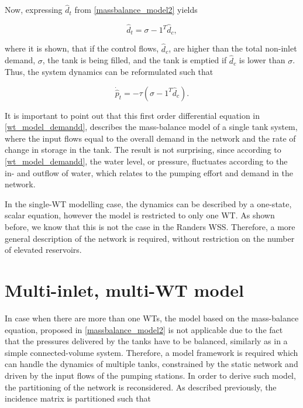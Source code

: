 Now, expressing $\hat{d}_t $ from \eqref{massbalance_model2} yields

\begin{equation}
\label{massbalance_model2_1}
\hat{d}_t  = \sigma - 1^T \hat{d}_c,
\end{equation}

where it is shown, that if the control flows, $\hat{d}_c$, are higher than the total non-inlet demand, $\sigma$, the tank is being filled, and the tank is emptied if $\hat{d}_c$ is lower than $\sigma$. Thus, the system dynamics can be reformulated such that

\begin{equation}
\label{wt_model_demandd}
\dot{\hat{p}}_t = -\tau (\sigma - 1^T \hat{d}_c).
\end{equation}

It is important to point out that this first order differential equation in \eqref{wt_model_demandd}, describes the mass-balance model of a single tank system, where the input flows equal to the overall demand in the network and the rate of change in storage in the tank. The result is not surprising, since according to \eqref{wt_model_demandd}, the water level, or pressure, fluctuates according to the in- and outflow of water, which relates to the pumping effort and demand in the network. 

In the single-WT modelling case, the dynamics can be described by a one-state, scalar equation, however the model is restricted to only one WT. As shown before, we know that this is not the case in the Randers WSS. Therefore, a more general description of the network is required, without restriction on the number of elevated reservoirs. 


\section{Multi-inlet, multi-WT model}
\label{multi_inlet_multi_WT_model}

In case when there are more than one WTs, the model based on the mass-balance equation, proposed in \eqref{massbalance_model2} is not applicable due to the fact that the pressures delivered by the tanks have to be balanced, similarly as in a simple connected-volume system. Therefore, a model framework is required which can handle the dynamics of multiple tanks, constrained by the static network and driven by the input flows of the pumping stations. In order to derive such model, the partitioning of the network is reconsidered. As described previously, the incidence matrix is partitioned such that 


